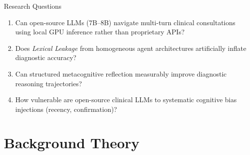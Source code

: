 \documentclass[aspectratio=169,11pt]{beamer}
\begin{document}
\begin{frame}{Research Questions}
\begin{enumerate}
  \item[\textbf{RQ1.}] Can open-source LLMs (7B--8B) navigate multi-turn clinical consultations using local GPU inference rather than proprietary APIs?
  \vspace{0.6em}
  \item[\textbf{RQ2.}] Does \textit{Lexical Leakage} from homogeneous agent architectures artificially inflate diagnostic accuracy?
  \vspace{0.6em}
  \item[\textbf{RQ3.}] Can structured metacognitive reflection measurably improve diagnostic reasoning trajectories?
  \vspace{0.6em}
  \item[\textbf{RQ4.}] How vulnerable are open-source clinical LLMs to systematic cognitive bias injections (recency, confirmation)?
\end{enumerate}

\end{frame}

\section{Background Theory}
\end{document}
